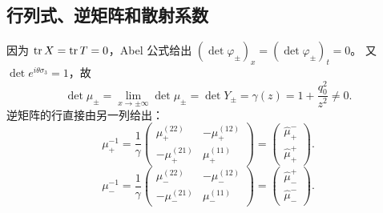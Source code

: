 \documentclass[lang=cn,scheme=chinese,mode=simple,device=normal,color=blue,
math=cm,thmcnt=section,12pt]{elegantbook}
\newcommand{\eqq}[2]{\tag{#1}\label{eq:#1}#2}
\begin{document}
\subsection{行列式、逆矩阵和散射系数}
因为 $\operatorname{tr} X=\operatorname{tr} T=0$，Abel 公式给出 $(\det\varphi_\pm)_x=(\det\varphi_\pm)_t=0$。
又 $\det e^{i\theta\sigma_3}=1$，故
\begin{equation}\eqq{6.4.28}{\det\mu_\pm=\lim\limits_{x\to\pm\infty}\det\mu_\pm
        =\det Y_\pm=\gamma(z)=1+\dfrac{q_0^2}{z^2}\ne0.}\end{equation}
逆矩阵的行直接由另一列给出：
\begin{equation}\eqq{6.4.29}{\mu_+^{-1}=\dfrac{1}{\gamma}\begin{pmatrix}\mu_+^{(22)}&-\mu_+^{(12)}\\-\mu_+^{(21)}&\mu_+^{(11)}\end{pmatrix}=\begin{pmatrix}\widehat\mu_+^-\\\widehat\mu_+^+\end{pmatrix}.}\end{equation}
\begin{equation}\eqq{6.4.30}{\mu_-^{-1}=\dfrac{1}{\gamma}\begin{pmatrix}\mu_-^{(22)}&-\mu_-^{(12)}\\-\mu_-^{(21)}&\mu_-^{(11)}\end{pmatrix}=\begin{pmatrix}\widehat\mu_-^+\\\widehat\mu_-^-\end{pmatrix}.}\end{equation}
\end{document}
